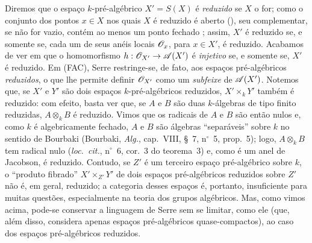 \begin{env}[10.10.4]
\label{IV.10.10.4}
Diremos que o espaço $k$-pré-algébrico $X'=S(X)$ é \emph{reduzido} se $X$ o for; como o conjunto dos pontos $x\in X$ nos quais $X$ é reduzido é aberto (), seu complementar, se não for vazio, contém ao menos um ponto fechado ; assim, $X'$ é reduzido se, e somente se, cada um de seus anéis locais $\mathscr{O}_x$, para $x\in X'$, é reduzido.
Acabamos de ver em  que o homomorfismo $h:\sh{O}_{X'}\to\sh{A}(X')$ é \emph{injetivo} se, e somente se, $X'$ é reduzido.
Em (FAC), Serre restringe-se, de fato, aos espaços pré-algébricos \emph{reduzidos}, o que lhe permite definir $\mathscr{O}_{X'}$ como um \emph{subfeixe} de $\mathscr{A}(X')$.
Notemos que, se $X'$ e $Y'$ são dois espaços $k$-pré-algébricos reduzidos, $X'\times_kY'$ também é reduzido: com efeito, basta ver que, se $A$ e $B$ são duas $k$-álgebras de tipo finito reduzidas, $A\otimes_kB$ é reduzido.
Vimos que os radicais de $A$ e $B$ são então nulos e, como $k$ é algebricamente fechado, $A$ e $B$ são álgebras ``separáveis'' sobre $k$ no sentido de Bourbaki (Bourbaki, \emph{Alg.}, cap.~VIII, \S~7, n$^\circ$~5, prop.~5); logo, $A\otimes_kB$ tem radical nulo (\emph{loc.\ cit.}, n$^\circ$~6, cor.~3 do teorema~3) e, como é um anel de Jacobson, é reduzido.
Contudo, se $Z'$ é um terceiro espaço pré-algébrico sobre $k$, o ``produto fibrado'' $X'\times_{Z'}Y'$ de dois espaços pré-algébricos reduzidos sobre $Z'$ não é, em geral, reduzido; a categoria desses espaços é, portanto, insuficiente para muitas questões, especialmente na teoria dos grupos algébricos.
Mas, como vimos acima, pode-se conservar a linguagem de Serre sem se limitar, como ele (que, além disso, considera apenas espaços pré-algébricos quase-compactos), ao caso dos espaços pré-algébricos reduzidos.
\end{env}


